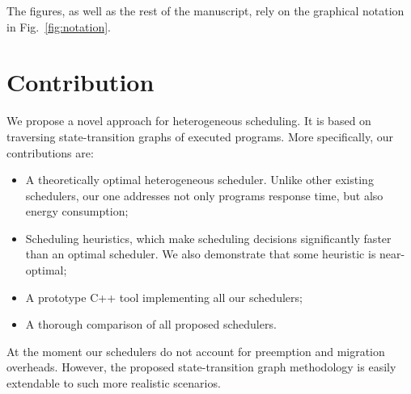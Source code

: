 The figures, as well as the rest of the manuscript, rely on the graphical notation in Fig.~\ref{fig:notation}.




\section{Contribution} 
We propose a novel approach for heterogeneous scheduling. It is based on traversing state-transition graphs of executed programs. More specifically, our contributions are:
%
\begin{itemize}
\item A theoretically optimal heterogeneous scheduler. Unlike other existing schedulers, our one addresses not only programs response time, but also energy consumption;
\item Scheduling heuristics, which make scheduling decisions significantly faster than an optimal scheduler. We also demonstrate  that some heuristic is near-optimal;
\item A prototype C++ tool implementing all our schedulers;
\item A thorough comparison of all proposed schedulers.
\end{itemize}
%
At the moment our schedulers do not account for preemption and migration overheads. However, the proposed state-transition graph methodology is easily extendable to such more realistic scenarios.

